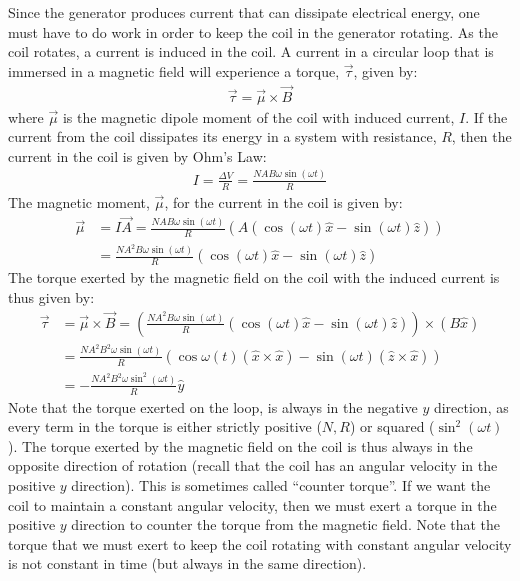 Since the generator produces current that can dissipate electrical energy, one must have to do work in order to keep the coil in the generator rotating. As the coil rotates, a current is induced in the coil. A current in a circular loop that is immersed in a magnetic field will experience a torque, $\vec \tau$, given by:
\begin{align*}
\vec \tau = \vec \mu \times \vec B
\end{align*}
where $\vec \mu$ is the magnetic dipole moment of the coil with induced current, $I$. If the current from the coil dissipates its energy in a system with resistance, $R$, then the current in the coil is given by Ohm's Law:
\begin{align*}
I = \frac{\Delta V}{R}=\frac{NAB\omega\sin(\omega t)}{R}
\end{align*}
The magnetic moment, $\vec \mu$, for the current in the coil is given by:
\begin{align*}
\vec \mu &= I\vec A = \frac{NAB\omega\sin(\omega t)}{R} (A(\cos(\omega t) \hat x -\sin(\omega t)\hat z))\\
&=\frac{NA^2B\omega\sin(\omega t)}{R} (\cos(\omega t) \hat x -\sin(\omega t)\hat z)
\end{align*}
The torque exerted by the magnetic field on the coil with the induced current is thus given by:
\begin{align*}
\vec \tau &= \vec \mu \times \vec B = \left(\frac{NA^2B\omega\sin(\omega t)}{R} (\cos(\omega t) \hat x -\sin(\omega t)\hat z)\right) \times (B\hat x)\\
&=\frac{NA^2B^2\omega\sin(\omega t)}{R}(\cos\omega(t)(\hat x \times \hat x)-\sin(\omega t)(\hat z \times \hat x))\\
&=-\frac{NA^2B^2\omega\sin^2(\omega t)}{R}\hat y
\end{align*}
Note that the torque exerted on the loop, is always in the negative $y$ direction, as every term in the torque is either strictly positive ($N,R$) or squared ($\sin^2(\omega t)$). The torque exerted by the magnetic field on the coil is thus always in the opposite direction of rotation (recall that the coil has an angular velocity in the positive $y$ direction). This is sometimes called ``counter torque''. If we want the coil to maintain a constant angular velocity, then we must exert a torque in the positive $y$ direction to counter the torque from the magnetic field. Note that the torque that we must exert to keep the coil rotating with constant angular velocity is not constant in time (but always in the same direction). 

